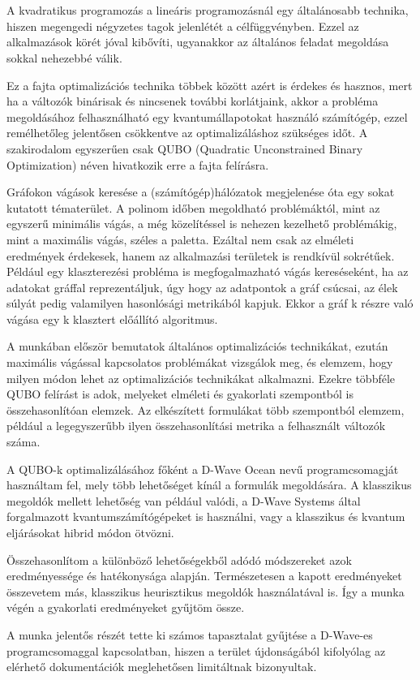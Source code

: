 \chapter{\bevezetes}

A kvadratikus programozás a lineáris programozásnál egy általánosabb technika, hiszen megengedi négyzetes tagok jelenlétét a célfüggvényben. Ezzel az alkalmazások körét jóval kibővíti, ugyanakkor az általános feladat megoldása sokkal nehezebbé válik.

Ez a fajta optimalizációs technika többek között azért is érdekes és hasznos, mert ha a változók binárisak és nincsenek további korlátjaink, akkor a probléma megoldásához felhasználható egy kvantumállapotokat használó számítógép, ezzel remélhetőleg jelentősen csökkentve az optimalizáláshoz szükséges időt. A szakirodalom egyszerűen csak QUBO (Quadratic Unconstrained Binary Optimization) néven hivatkozik erre a fajta felírásra.

Gráfokon vágások keresése a (számítógép)hálózatok megjelenése óta egy sokat kutatott tématerület. A polinom időben megoldható problémáktól, mint az egyszerű minimális vágás, a még közelítéssel is nehezen kezelhető problémákig, mint a maximális vágás, széles a paletta. Ezáltal nem csak az elméleti eredmények érdekesek, hanem az alkalmazási területek is rendkívül sokrétűek. Például egy klaszterezési probléma is megfogalmazható vágás kereséseként, ha az adatokat gráffal reprezentáljuk, úgy hogy az adatpontok a gráf csúcsai, az élek súlyát pedig valamilyen hasonlósági metrikából kapjuk. Ekkor a gráf k részre való vágása egy k klasztert előállító algoritmus.

A munkában először bemutatok általános optimalizációs technikákat, ezután maximális vágással kapcsolatos problémákat vizsgálok meg, és elemzem, hogy milyen módon lehet az optimalizációs technikákat alkalmazni. Ezekre többféle QUBO felírást is adok, melyeket elméleti és gyakorlati szempontból is összehasonlítóan elemzek. Az elkészített formulákat több szempontból elemzem, például a legegyszerűbb ilyen összehasonlítási metrika a felhasznált változók száma.

A QUBO-k optimalizálásához főként a D-Wave Ocean nevű programcsomagját használtam fel, mely több lehetőséget kínál a formulák megoldására. A klasszikus megoldók mellett lehetőség van például valódi, a D-Wave Systems által forgalmazott kvantumszámítógépeket is használni, vagy a klasszikus és kvantum eljárásokat hibrid módon ötvözni.

Összehasonlítom a különböző lehetőségekből adódó módszereket azok eredményessége és hatékonysága alapján.
Természetesen a kapott eredményeket összevetem más, klasszikus heurisztikus megoldók használatával is.
Így a munka végén a gyakorlati eredményeket gyűjtöm össze.

A munka jelentős részét tette ki számos tapasztalat gyűjtése a D-Wave-es programcsomaggal kapcsolatban, hiszen a terület újdonságából kifolyólag az elérhető dokumentációk meglehetősen limitáltnak bizonyultak.